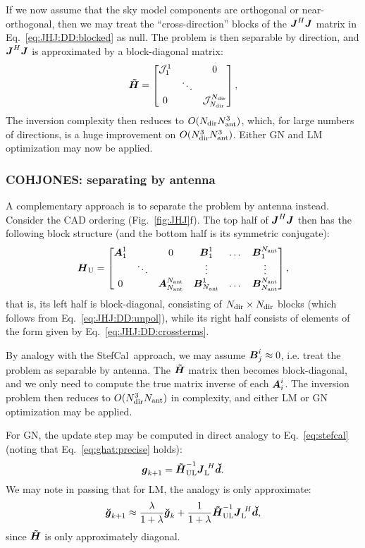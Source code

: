 \documentclass[useAMS,usenatbib]{mn2e}
\makeatletter
\newcommand{\mat}[1]{{\bmath{#1}}}
\newcommand{\JJ}{\mat{J}} %
\newcommand{\HH}{\mat{H}} %
\newcommand{\HHa}{\mat{\tilde{H}}} %
\newcommand{\JHJ}{\JJ^H\JJ} %
\newcommand{\Matrix}[2]{\left [ \begin{array}{@{}#1@{}}#2\end{array} \right ]}
\newcommand{\AUG}[1]{\bmath{\breve{#1}}}
\newcommand{\Gg}{\AUG{g}}
\newcommand{\Dd}{\AUG{d}}
\newcommand{\TOP}{\mathrm{U}}%
\newcommand{\LEFT}{\mathrm{L}}
\newcommand{\UL}{\mathrm{UL}}%
\newcommand{\StefCal}{{\sc StefCal}}
\numberwithin{equation}{section}
\makeatother
\begin{document}
If we now assume that the sky model components are orthogonal or near-orthogonal, then 
we may treat the ``cross-direction'' blocks of the $\JHJ$ matrix in Eq.~\ref{eq:JHJ:DD:blocked} as null. The problem is 
then separable by direction, and $\JHJ$ is approximated by a block-diagonal matrix:
\begin{equation}
\label{eq:JHJ:DD:block-diag}
\HHa = \Matrix{ccc}{\JJJ^1_1 &  & 0 \\
& \ddots &  \\
0 & & \JJJ_{\Nd}^{\Nd} },
\end{equation}
The inversion complexity then reduces to $O(N_\mathrm{dir}N_\mathrm{ant}^3)$, which, for large numbers of directions, is a huge improvement on 
$O(N_\mathrm{dir}^3N_\mathrm{ant}^3)$. Either GN and LM optimization may now be applied. 

\newcommand{\JJX}{\bmath{A}}
\newcommand{\JJY}{\bmath{B}}

\subsubsection{COHJONES: separating by antenna}

A complementary approach is to separate the problem by antenna instead. Consider the CAD ordering (Fig.~\ref{fig:JHJ}f). 
The top half of $\JHJ$ then has the following block structure (and the bottom half is its symmetric conjugate):
\begin{equation}
\label{eq:JHJ:DD:blocked-ant}
\HH_\TOP = \Matrix{cccccc}{\JJX^1_1 &  & 0 & \JJY^1_1 & \dots & \JJY^{\Na}_1 \\
 & \ddots &  & \vdots & & \vdots \\
0 &  & \JJX_{\Na}^{\Na} & \JJY_{\Na}^1 & \dots & \JJY_{\Na}^{\Na} },
\end{equation}
that is, its left half is block-diagonal, consisting of $N_\mathrm{dir}\times N_\mathrm{dir}$ blocks (which follows
from Eq.~\ref{eq:JHJ:DD:unpol}), while its right half consists of elements of the form given by
Eq.~\ref{eq:JHJ:DD:crossterms}. 

By analogy with the \StefCal\ approach, we may assume $\JJY^i_j \approx 0$, i.e. treat the problem as
separable by antenna. The $\HHa$ matrix then becomes block-diagonal, and we only need to compute the 
true matrix inverse of each $\JJX^i_i$. The inversion problem then reduces to $O(N_\mathrm{dir}^3N_\mathrm{ant})$ in complexity,
and either LM or GN optimization may be applied.

For GN, the update step may be computed in direct analogy to Eq.~\ref{eq:stefcal} (noting that Eq.~\ref{eq:ghat:precise}
holds):
\begin{equation}
\bmath{g}_{k+1} = \HHa_\UL^{-1} \JJ_\LEFT^{~H} \Dd.
\end{equation}
We may note in passing that for LM, the analogy is only approximate:
\begin{equation}
\Gg_{k+1} \approx \frac{\lambda}{1+\lambda}\Gg_k + \frac{1}{1+\lambda} \HHa_\UL^{-1} \JJ_\LEFT^{~H} \Dd,
\end{equation}
since $\HHa$ is only approximately diagonal.
\end{document}
